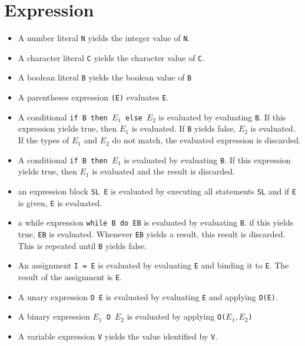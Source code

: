 \section{Expression}
\begin{itemize}
\item A number literal \texttt{N} yields the integer value of \texttt{N}.
\item A character literal \texttt{C} yields the character value of \texttt{C}.
\item A boolean literal \texttt{B} yields the boolean value of \texttt{B}
\item A parentheses expression \texttt{(E)} evaluates \texttt{E}.
\item A conditional \texttt{if B then $E_1$ else $E_2$} is evaluated by evaluating \texttt{B}. If this expression yields true, then \texttt{$E_1$} is evaluated. If \texttt{B} yields false, \texttt{$E_2$} is evaluated. If the types of \texttt{$E_1$} and \texttt{$E_2$} do not match, the evaluated expression is discarded.
\item A conditional \texttt{if B then $E_1$} is evaluated by evaluating \texttt{B}. If this expression yields true, then \texttt{$E_1$} is evaluated and the result is discarded. 
\item an expression block \texttt{SL E} is evaluated by executing all statements \texttt{SL} and if \texttt{E} is given, \texttt{E} is evaluated.
\item a while expression \texttt{while B do EB} is evaluated by evaluating \texttt{B}. if this yields true, \texttt{EB} is evaluated. Whenever \texttt{EB} yields a result, this result is discarded. This is repeated until \texttt{B} yields false.
\item An assignment \texttt{I = E} is evaluated by evaluating \texttt{E} and binding it to \texttt{E}. The result of the assignment is \texttt{E}.
\item A unary expression \texttt{O E} is evaluated by evaluating \texttt{E} and applying \texttt{O(E)}.
\item A binary expression \texttt{$E_1$ O $E_2$} is evaluated by applying \texttt{O($E_1, E_2$)} 
\item A variable expression \texttt{V} yields the value identified by \texttt{V}.
\end{itemize}
